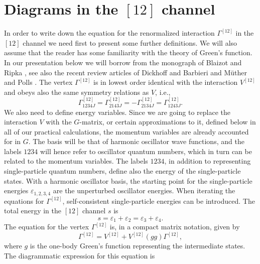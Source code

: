 \documentclass{article}
\begin{document}
\section{Diagrams in the $[12]$ channel}
\label{sec:sec3}


In order to write down the equation for the renormalized
interaction $\Gamma^{[12]}$ in the
$[12]$ channel we need first to present some further definitions.
We will also assume that the reader has some familiarity with the theory
of Green's function. In our presentation below we will
borrow from the monograph of Blaizot and Ripka \cite{br86}, see also the recent review 
articles of Dickhoff and Barbieri \cite{db04} and M\"uther and Polls \cite{mp00}.
The vertex $\Gamma^{[12]}$ is in lowest order identical with the
interaction $V^{[12]}$ and obeys also the same symmetry relations
as $V$, i.e.,
\begin{equation}
     \Gamma^{[12]}_{1234J}=\Gamma^{[12]}_{2143J}=-\Gamma^{[12]}_{2134J}=
     \Gamma^{[12]}_{1243J}.
     \label{eq:symproperties}
\end{equation}
We also need to define energy variables. Since we are going to
replace the interaction $V$ with the $G$-matrix, or certain
approximations to it,  defined below in all
of our practical calculations, the momentum variables are already
accounted for in $G$. The basis will be that of harmonic oscillator
wave functions, and the labels $1234$ will hence refer to oscillator
quantum numbers, which in turn can be related to the momentum
variables. The labels $1234$, in addition to representing
single-particle quantum numbers, define also the energy of the single-particle
states. With a harmonic oscillator basis, the starting point for the
single-particle energies $\varepsilon_{1,2,3,4}$ are the unperturbed
oscillator energies. When iterating the equations for $\Gamma^{[12]}$,
self-consistent single-particle energies can be introduced.
The total energy in the $[12]$ channel $s$ is
\begin{equation}
    s=\varepsilon_1+\varepsilon_2=\varepsilon_3+\varepsilon_4.
    \label{eq:energy12}
\end{equation}
The equation for the vertex $\Gamma^{[12]}$ is,
in a compact matrix notation, given by \cite{br86}
\begin{equation}
     \Gamma^{[12]}=V^{[12]}+V^{[12]}(gg)\Gamma^{[12]},
     \label{eq:schematic12}
\end{equation}
where $g$ is the one-body Green's function representing
the intermediate states.
The diagrammatic expression for this equation is
\end{document}
